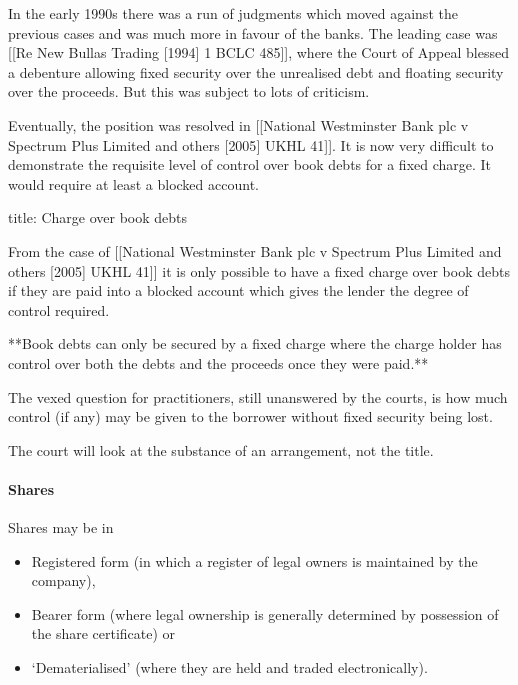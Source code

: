 \documentclass[
]{article}
\newenvironment{Shaded}{}{}
\newcommand{\NormalTok}[1]{#1}
\providecommand{\tightlist}{%
  \setlength{\itemsep}{0pt}\setlength{\parskip}{0pt}}
\begin{document}
In the early 1990s there was a run of judgments which moved against the
previous cases and was much more in favour of the banks. The leading
case was {[}{[}Re New Bullas Trading {[}1994{]} 1 BCLC 485{]}{]}, where
the Court of Appeal blessed a debenture allowing fixed security over the
unrealised debt and floating security over the proceeds. But this was
subject to lots of criticism.

Eventually, the position was resolved in {[}{[}National Westminster Bank
plc v Spectrum Plus Limited and others {[}2005{]} UKHL 41{]}{]}. It is
now very difficult to demonstrate the requisite level of control over
book debts for a fixed charge. It would require at least a blocked
account.

\begin{Shaded}
\begin{Highlighting}[]
\NormalTok{title: Charge over book debts}

\NormalTok{From the case of [[National Westminster Bank plc v Spectrum Plus Limited and others [2005] UKHL 41]] it is only possible to have a fixed charge over book debts if they are paid into a blocked account which gives the lender the degree of control required.}

\NormalTok{**Book debts can only be secured by a fixed charge where the charge holder has control over both the debts and the proceeds once they were paid.**}
\end{Highlighting}
\end{Shaded}

The vexed question for practitioners, still unanswered by the courts, is
how much control (if any) may be given to the borrower without fixed
security being lost.

The court will look at the substance of an arrangement, not the title.

\hypertarget{shares}{%
\paragraph{Shares}\label{shares}}

Shares may be in

\begin{itemize}
\tightlist
\item
  Registered form (in which a register of legal owners is maintained by
  the company),
\item
  Bearer form (where legal ownership is generally determined by
  possession of the share certificate) or
\item
  `Dematerialised' (where they are held and traded electronically).
\end{itemize}
\end{document}
